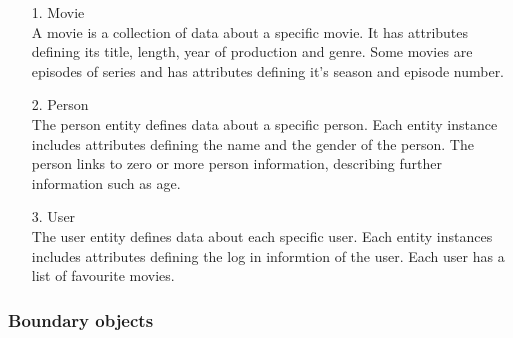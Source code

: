 \begin{enumerate}
	\item[1.] Movie \hfill \\
	A movie is a collection of data about a specific movie. It has attributes defining its title, length, year of production and genre. Some movies are episodes of series and has attributes defining it's season and episode number.
	
	\item[2.] Person \hfill \\
	The person entity defines data about a specific person. Each entity instance includes attributes defining the name and the gender of the person. The person links to zero or more person information, describing further information such as age.
	
	\item[3.] User \hfill \\
	The user entity defines data about each specific user. Each entity instances includes attributes defining the log in informtion of the user. Each user has a list of favourite movies.
	
\end{enumerate}

\subsubsection{Boundary objects}

